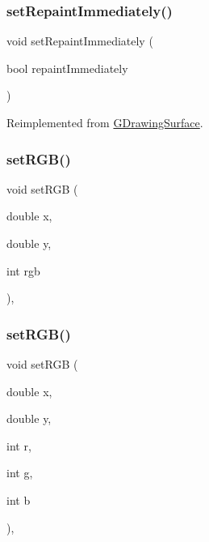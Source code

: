 \subsubsection{\texorpdfstring{set\+Repaint\+Immediately()}{setRepaintImmediately()}}
{\footnotesize\ttfamily void set\+Repaint\+Immediately (\begin{DoxyParamCaption}\item[{bool}]{repaint\+Immediately }\end{DoxyParamCaption})\hspace{0.3cm}{\ttfamily [virtual]}}



Reimplemented from \mbox{\hyperlink{classGDrawingSurface_abf5590a3992dcb7896ed449e65961da3}{G\+Drawing\+Surface}}.

\mbox{\label{classGDrawingSurface_a8bcbd65fa784bdab1e66a9efd381162d}} 
\subsubsection{\texorpdfstring{set\+R\+G\+B()}{setRGB()}\hspace{0.1cm}{\footnotesize\ttfamily [1/3]}}
{\footnotesize\ttfamily void set\+R\+GB (\begin{DoxyParamCaption}\item[{double}]{x,  }\item[{double}]{y,  }\item[{int}]{rgb }\end{DoxyParamCaption})\hspace{0.3cm}{\ttfamily [virtual]}, {\ttfamily [inherited]}}

\mbox{\label{classGDrawingSurface_a81202471d4fc9f2015aef0bc073acfab}} 
\subsubsection{\texorpdfstring{set\+R\+G\+B()}{setRGB()}\hspace{0.1cm}{\footnotesize\ttfamily [2/3]}}
{\footnotesize\ttfamily void set\+R\+GB (\begin{DoxyParamCaption}\item[{double}]{x,  }\item[{double}]{y,  }\item[{int}]{r,  }\item[{int}]{g,  }\item[{int}]{b }\end{DoxyParamCaption})\hspace{0.3cm}{\ttfamily [virtual]}, {\ttfamily [inherited]}}

